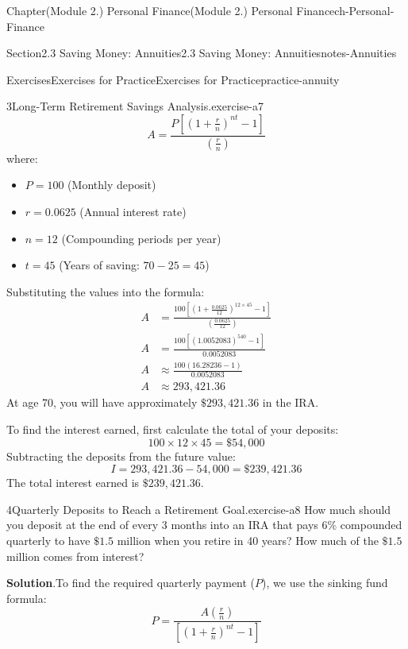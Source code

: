 \documentclass[oneside,10pt,]{book}
\newcommand{\blocktitlefont}{\relax}
\newcommand{\ptxlistdisc}{\raisebox{0.3ex}{\textbullet}}
\newcommand{\amp}{&}
\begin{document}
\begin{chapterptx}{Chapter}{(Module 2.) Personal Finance}{}{(Module 2.) Personal Finance}{}{}{ch-Personal-Finance}
\begin{sectionptx}{Section}{2.3 Saving Money: Annuities}{}{2.3 Saving Money: Annuities}{}{}{notes-Annuities}
\begin{exercises-subsection-numberless}{Exercises}{Exercises for Practice}{}{Exercises for Practice}{}{}{practice-annuity}
\begin{divisionexercise}{3}{Long-Term Retirement Savings Analysis.}{}{exercise-a7}
\begin{equation*}
A = \frac{P\left[\left(1+\frac{r}{n}\right)^{nt}-1\right]}{\left(\frac{r}{n}\right)}
\end{equation*}
where:%
\begin{itemize}[label=\ptxlistdisc]
\item{}\(P = 100\) (Monthly deposit)%
\item{}\(r = 0.0625\) (Annual interest rate)%
\item{}\(n = 12\) (Compounding periods per year)%
\item{}\(t = 45\) (Years of saving: \(70 - 25 = 45\))%
\end{itemize}
%
\par
Substituting the values into the formula:%
\begin{align*}
A \amp = \frac{100\left[\left(1 + \frac{0.0625}{12}\right)^{12 \times 45} - 1\right]}{\left(\frac{0.0625}{12}\right)}\\
A \amp = \frac{100\left[(1.0052083)^{540} - 1\right]}{0.0052083}\\
A \amp \approx \frac{100(16.28236 - 1)}{0.0052083}\\
A \amp \approx 293,421.36
\end{align*}
At age 70, you will have approximately \(\$293,421.36\) in the IRA.%
\par
To find the interest earned, first calculate the total of your deposits:%
\begin{equation*}
100 \times 12 \times 45 = \$54,000
\end{equation*}
Subtracting the deposits from the future value:%
\begin{equation*}
I = 293,421.36 - 54,000 = \$239,421.36
\end{equation*}
The total interest earned is \(\$239,421.36\).%
\end{divisionexercise}%
\begin{divisionexercise}{4}{Quarterly Deposits to Reach a Retirement Goal.}{}{exercise-a8}%
How much should you deposit at the end of every 3 months into an IRA that pays \(6\%\) compounded quarterly to have \(\$1.5\) million when you retire in 40 years? How much of the \(\$1.5\) million comes from interest?%
\par\smallskip%
\noindent\textbf{\blocktitlefont Solution}.\hypertarget{exercise-a8-3}{}\quad{}To find the required quarterly payment (\(P\)), we use the sinking fund formula:%
\begin{equation*}
P = \frac{A \left( \frac{r}{n} \right)}{\left[ \left( 1 + \frac{r}{n} \right)^{nt} - 1 \right]}

\end{equation*}
\end{divisionexercise}
\end{exercises-subsection-numberless}
\end{sectionptx}
\end{chapterptx}
\end{document}
